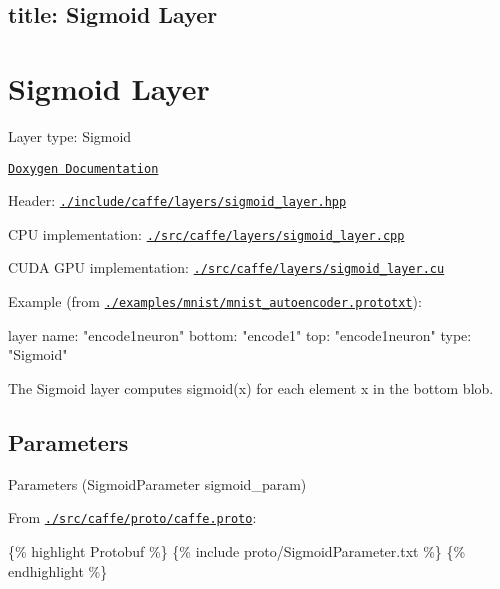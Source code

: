

 \subsection*{title\+: Sigmoid Layer }

\section*{Sigmoid Layer}


\begin{DoxyItemize}
\item Layer type\+: {\ttfamily Sigmoid}
\item \href{http://caffe.berkeleyvision.org/doxygen/classcaffe_1_1SigmoidLayer.html}{\tt Doxygen Documentation}
\item Header\+: \href{https://github.com/BVLC/caffe/blob/master/include/caffe/layers/sigmoid_layer.hpp}{\tt {\ttfamily ./include/caffe/layers/sigmoid\+\_\+layer.hpp}}
\item C\+PU implementation\+: \href{https://github.com/BVLC/caffe/blob/master/src/caffe/layers/sigmoid_layer.cpp}{\tt {\ttfamily ./src/caffe/layers/sigmoid\+\_\+layer.cpp}}
\item C\+U\+DA G\+PU implementation\+: \href{https://github.com/BVLC/caffe/blob/master/src/caffe/layers/sigmoid_layer.cu}{\tt {\ttfamily ./src/caffe/layers/sigmoid\+\_\+layer.cu}}
\item Example (from \href{https://github.com/BVLC/caffe/blob/master/examples/mnist/mnist_autoencoder.prototxt}{\tt {\ttfamily ./examples/mnist/mnist\+\_\+autoencoder.prototxt}})\+: \begin{DoxyVerb}layer {
  name: "encode1neuron"
  bottom: "encode1"
  top: "encode1neuron"
  type: "Sigmoid"
}
\end{DoxyVerb}

\end{DoxyItemize}

The {\ttfamily Sigmoid} layer computes {\ttfamily sigmoid(x)} for each element {\ttfamily x} in the bottom blob.

\subsection*{Parameters}


\begin{DoxyItemize}
\item Parameters ({\ttfamily Sigmoid\+Parameter sigmoid\+\_\+param})
\item From \href{https://github.com/BVLC/caffe/blob/master/src/caffe/proto/caffe.proto}{\tt {\ttfamily ./src/caffe/proto/caffe.proto}}\+:
\end{DoxyItemize}

\{\% highlight Protobuf \%\} \{\% include proto/\+Sigmoid\+Parameter.\+txt \%\} \{\% endhighlight \%\} 